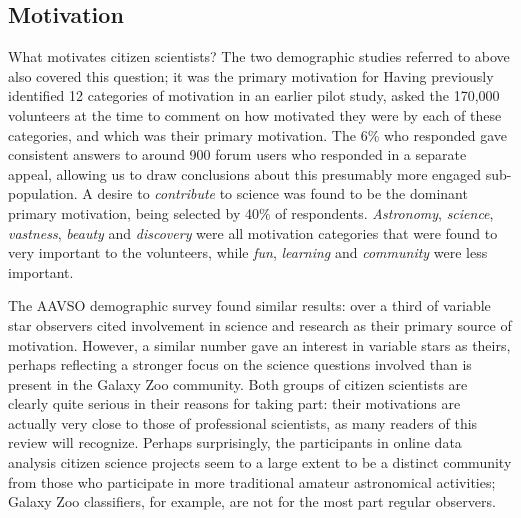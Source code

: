 \documentclass{ar2e}
\begin{document}

\subsection{Motivation}
\label{sec:crowd:motivation}


What motivates citizen scientists? The two demographic studies referred to
above also covered this question; it was the primary motivation for
\citeauthor{Rad++2013} Having previously \citep{Rad++2010} identified 12
categories of motivation in an earlier pilot study, \citet{Rad++2013} asked
the 170,000 volunteers at the time to comment on how motivated they were by
each of these categories, and which was their primary motivation. The 6\% who
responded gave consistent answers to around 900 forum users who responded in a
separate appeal, allowing us to draw conclusions about this presumably more
engaged sub-population. A desire to {\it contribute} to science was found to
be the dominant primary motivation, being selected by 40\% of respondents.
{\it Astronomy}, {\it science}, {\it vastness}, {\it beauty} and  {\it
discovery} were all motivation categories that were found to very important to
the volunteers, while {\it fun}, {\it learning} and {\it community} were less
important. 

The AAVSO demographic survey \citep{P+P2012} found similar results: over a third
of variable star observers cited involvement in science and research as their
primary source of motivation. However, a similar number gave an interest in
variable stars as theirs, perhaps reflecting a stronger focus on the science
questions involved than is present in the Galaxy Zoo community. Both groups of
citizen scientists are clearly quite serious in their reasons for taking part:
their motivations are actually very close to those of professional scientists,
as many readers of this review will recognize. Perhaps surprisingly, the
participants in online data analysis citizen science projects seem to a large
extent to be a distinct community from those who participate in more traditional
amateur astronomical activities; Galaxy Zoo classifiers, for example, are not
for the most part regular observers. 
\end{document}
